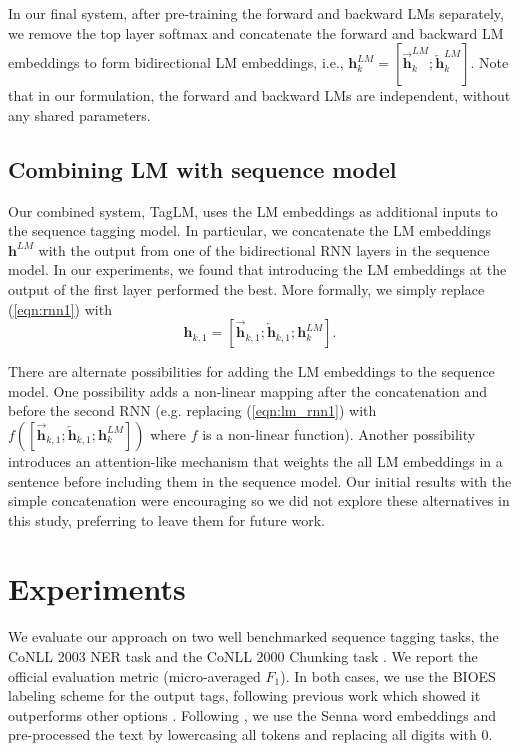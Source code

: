 \documentclass[11pt,a4paper]{article}
\begin{document}
In our final system, after pre-training the forward and backward LMs separately, we remove the top layer
softmax and concatenate the forward and backward LM embeddings to form bidirectional LM embeddings, i.e., 
$\mathbf{h}^{LM}_k = [\overrightarrow{\mathbf{h}}^{LM}_k; \overleftarrow{\mathbf{h}}^{LM}_k]$.
Note that in our formulation, the forward and backward LMs are independent, without
any shared parameters.


\subsection{Combining LM with sequence model}
\label{sec:combining}

Our combined system, TagLM, uses the LM embeddings as additional inputs to the sequence tagging model.
In particular, we concatenate the LM embeddings $\mathbf{h}^{LM}$ with the output from one of the bidirectional RNN
layers in the sequence model.
In our experiments, we found that introducing the LM embeddings
at the output of the first layer performed the best.  More formally, we simply replace (\ref{eqn:rnn1}) with
\begin{equation}
\mathbf{h}_{k,1} = [\overrightarrow{\mathbf{h}}_{k,1}; \overleftarrow{\mathbf{h}}_{k,1}; \mathbf{h}_k^{LM}].  \label{eqn:lm_rnn1}
\end{equation}

There are alternate possibilities for adding the LM embeddings to the sequence model.  One possibility adds a non-linear mapping after the concatenation and before the second RNN (e.g. replacing (\ref{eqn:lm_rnn1}) with $f([\overrightarrow{\mathbf{h}}_{k,1}; \overleftarrow{\mathbf{h}}_{k,1}; \mathbf{h}_k^{LM}])$ where $f$ is a non-linear function). Another possibility introduces an attention-like mechanism that weights the all LM embeddings in a sentence before including them in the sequence model.  
Our initial results with the simple concatenation were encouraging so we did not explore these alternatives in this study, preferring to leave them for future work.






\section{Experiments}

We evaluate our approach on two well benchmarked sequence tagging tasks,
the CoNLL 2003 NER task \citep{CoNLL2003NER} and the CoNLL 2000 Chunking task
\citep{CoNLL2000Chunking}.
We report the official evaluation metric
(micro-averaged $F_1$).  In both cases, we use
the BIOES labeling scheme for the output tags,
following previous work which showed it outperforms other options
\citep[e.g.,][]{Ratinov2009DesignCA}.
Following \citet{chiu-nichols-2016}, we use the Senna word embeddings \citep{NLPfromScratch:Collobert2011} and pre-processed the text by
lowercasing all tokens and replacing all digits with 0. 
\end{document}
